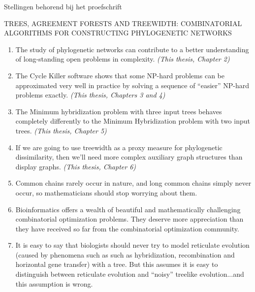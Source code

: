 \documentclass[a4paper,10pt]{article}
\begin{document}

\thispagestyle{empty}

\begin{center}
Stellingen behorend bij het proefschrift
\end{center}
\begin{center}
TREES, AGREEMENT FORESTS AND TREEWIDTH: COMBINATORIAL
ALGORITHMS FOR CONSTRUCTING PHYLOGENETIC NETWORKS
\end{center}


\begin{enumerate}
  \item The study of phylogenetic networks can contribute to a better understanding of
long-standing open problems in complexity. \emph{(This thesis, Chapter 2)}

\item The Cycle Killer software shows that some NP-hard problems can be approximated very well
in practice by solving a sequence of ``easier'' NP-hard problems exactly. \emph{(This thesis, Chapters 3 and 4)}

  \item The Minimum hybridization problem with three input trees behaves completely differently to the Minimum Hybridization problem with two input trees. \emph{(This thesis, Chapter 5)}
  
 \item If we are going to use treewidth as a proxy measure for phylogenetic dissimilarity, then we'll need more complex auxiliary graph structures than display graphs. \emph{(This thesis, Chapter 6)}
  
 \item Common chains rarely occur in nature, and long common chains simply never occur,
so mathematicians should stop worrying about them.

  \item Bioinformatics offers a wealth of beautiful and mathematically challenging combinatorial optimization problems. They deserve more appreciation than they have received so far from the combinatorial optimization community. 
  
  \item It is easy to say that biologists should never try to model reticulate evolution (caused by phenomena such as such as hybridization, recombination and horizontal gene transfer) with a tree. But this assumes it is easy to distinguish between reticulate evolution and ``noisy'' treelike evolution...and this assumption is wrong.
    

\end{enumerate}
\end{document}

